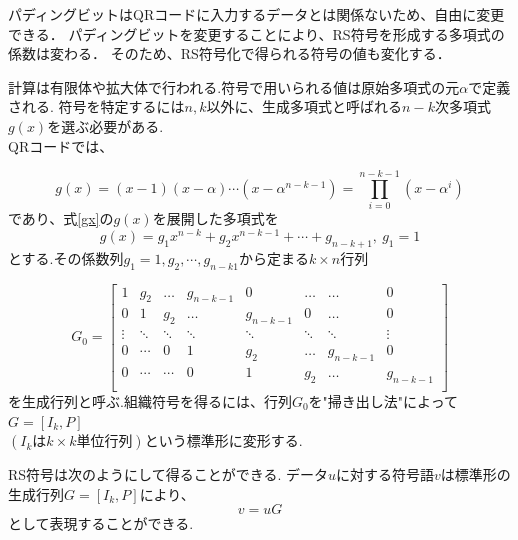 \documentclass{thesis}
\begin{document}
パディングビットはQRコードに入力するデータとは関係ないため、自由に変更できる．
パディングビットを変更することにより、RS符号を形成する多項式の係数は変わる．
そのため、RS符号化で得られる符号の値も変化する．



計算は有限体や拡大体で行われる.符号で用いられる値は原始多項式の元$\alpha$で定義される.
符号を特定するには$n,k$以外に、生成多項式\cite{Ikeda}\cite{Tom}と呼ばれる$n-k$次多項式$g(x)$を選ぶ必要がある.\\
QRコードでは、

\begin{equation}
 g(x)=(x-1)(x-\alpha)\cdots(x-\alpha^{n-k-1})= \prod_{i=0}^{n-k-1}(x-\alpha^i)
 \label{gx}
\end{equation}
であり、式\ref{gx}の$g(x)$を展開した多項式を
\begin{equation}
 g(x)=g_1x^{n-k}+g_2x^{n-k-1}+\cdots+g_{n-k+1},\ g_1=1
 \label{gx_ten}
\end{equation}
とする.その係数列$g_1=1,g_2,\cdots,g_{n-k1}$から定まる$k\times n$行列

\[
  G_0 = \left[
    \begin{array}{cccccccc}
      1        & g_2      & \ldots  & g_{n-k-1} & 0            & \ldots  & \ldots    & 0 \\
      0        & 1        & g_2      & \ldots     & g_{n-k-1}  & 0        & \ldots    & 0 \\
      \vdots & \ddots & \ddots & \ddots     & \ddots     & \ddots & \ddots   & \vdots \\
      0        & \cdots & 0        & 1            & g_2          & \ldots & g_{n-k-1} &       0       \\
      0        & \cdots & \cdots & 0            & 1            & g_2     & \ldots     & g_{n-k-1}       \\
    \end{array}
  \right]
\]
を生成行列と呼ぶ.組織符号を得るには、行列$G_0$を"掃き出し法"によって$G=[I_k,P]$\\
$(I_kはk\times k単位行列)$という標準形に変形する.

RS符号は次のようにして得ることができる.
データ$u$に対する符号語$v$は標準形の生成行列$G=[I_k,P]$により、
\begin{equation}
 v=uG
\end{equation}
として表現することができる.


\end{document}
